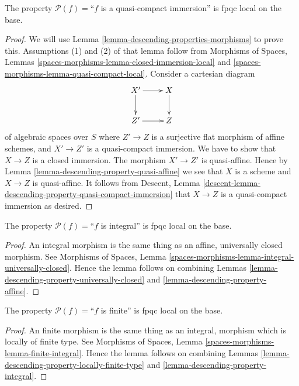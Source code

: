 \begin{lemma}
\label{lemma-descending-property-quasi-compact-immersion}
The property $\mathcal{P}(f) =$``$f$ is a quasi-compact immersion''
is fpqc local on the base.
\end{lemma}

\begin{proof}
We will use
Lemma \ref{lemma-descending-properties-morphisms}
to prove this. Assumptions (1) and (2) of that lemma follow from
Morphisms of Spaces,
Lemmas \ref{spaces-morphisms-lemma-closed-immersion-local} and
\ref{spaces-morphisms-lemma-quasi-compact-local}.
Consider a cartesian diagram
$$
\xymatrix{
X' \ar[r] \ar[d] & X \ar[d] \\
Z' \ar[r] & Z
}
$$
of algebraic spaces over $S$
where $Z' \to Z$ is a surjective flat morphism of affine schemes,
and $X' \to Z'$ is a quasi-compact immersion. We have to show that $X \to Z$
is a closed immersion. The morphism $X' \to Z'$ is quasi-affine. Hence by
Lemma \ref{lemma-descending-property-quasi-affine}
we see that $X$ is a scheme and $X \to Z$ is quasi-affine.
It follows from
Descent, Lemma \ref{descent-lemma-descending-property-quasi-compact-immersion}
that $X \to Z$ is a quasi-compact immersion as desired.
\end{proof}

\begin{lemma}
\label{lemma-descending-property-integral}
The property $\mathcal{P}(f) =$``$f$ is integral''
is fpqc local on the base.
\end{lemma}

\begin{proof}
An integral morphism is the same thing as an affine,
universally closed morphism. See
Morphisms of Spaces,
Lemma \ref{spaces-morphisms-lemma-integral-universally-closed}.
Hence the lemma follows on combining
Lemmas \ref{lemma-descending-property-universally-closed}
and \ref{lemma-descending-property-affine}.
\end{proof}

\begin{lemma}
\label{lemma-descending-property-finite}
The property $\mathcal{P}(f) =$``$f$ is finite''
is fpqc local on the base.
\end{lemma}

\begin{proof}
An finite morphism is the same thing as an integral,
morphism which is locally of finite type. See
Morphisms of Spaces, Lemma \ref{spaces-morphisms-lemma-finite-integral}.
Hence the lemma follows on combining
Lemmas \ref{lemma-descending-property-locally-finite-type}
and \ref{lemma-descending-property-integral}.
\end{proof}


